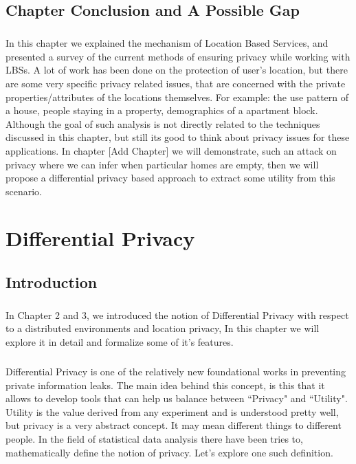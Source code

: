 \documentclass[12pt]{report}
\theoremstyle{named}
\begin{document}
\section{Chapter Conclusion and A Possible Gap}
\paragraph{}
In this chapter we explained the mechanism of Location Based Services, and presented a survey of the current methods of ensuring privacy while working with LBSs. A lot of work has been done on the protection of user's location, but there are some very specific privacy related issues, that are concerned with the private properties/attributes of the locations themselves. For example: the use pattern of a house, people staying in a property, demographics of a apartment block. Although the goal of such analysis is not directly related to the techniques discussed in this chapter, but still its good to think about privacy issues for these applications. In chapter [Add Chapter] we will demonstrate, such an attack on privacy where we can infer when particular homes are empty, then we will propose a differential privacy based approach to extract some utility from this scenario.

\chapter{Differential Privacy}
\label{chap:differentialPrivacy}
\section{Introduction}
\paragraph{}
In Chapter 2 and 3, we introduced the notion of Differential Privacy with respect to a distributed environments and location privacy, In this chapter we will explore it in detail and formalize some of it's features. 

\paragraph{}
Differential Privacy \cite{Dwork:2006:DP:2097282.2097284} is one of the relatively new foundational works in preventing private information leaks. The main idea behind this concept, is this that it allows to develop tools that can help us balance between ``Privacy" and ``Utility". Utility is the value derived from any experiment and is understood pretty well, but privacy is a very abstract concept. It may mean different things to different people. In the field of statistical data analysis there have been tries to, mathematically define the notion of privacy. Let's explore one such definition.
\end{document}
